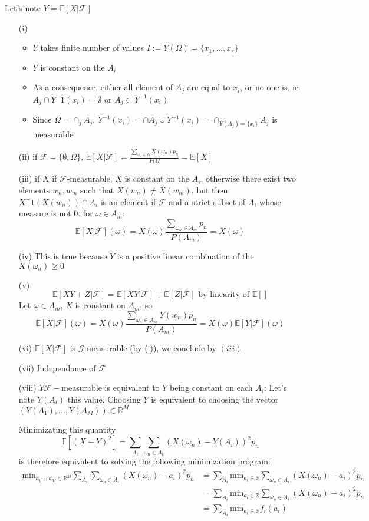 \documentclass[12pt]{article}
\newcommand{\Exp}[1]{\mathbb{E}[#1]}
\newcommand{\Fil}{\mathcal{F}}
\newcommand{\FExp}[1]{\mathbb{E}[#1 | \Fil]}
\newcommand{\Gil}{\mathcal{G}}
\begin{document}
Let's note $Y = \Exp{X | \Fil}$
\begin{itemize}

\item [(i)]
\begin{itemize}
\item $Y$ takes finite number of values $I := Y(\Omega) = \{x_1, ..., x_r\}$
\item $Y$ is constant on the $A_i$
\item As a consequence, either all element of $A_j$ are equal to $x_i$, or no one is. ie $A_j \cap Y^-1(x_i) = \emptyset$ or $A_j \subset Y^{-1}(x_i)$
\item Since $\Omega = \cap_j A_j$, $Y^{-1}(x_i) = \cap A_j \cup Y^{-1}(x_i) = \cap_{Y(A_j) = \{x_i\}}  A_j$ is measurable
\end{itemize}
\item [(ii)] if $\Fil = \{\emptyset, \Omega\}$, $\Exp{X | \Fil} = \frac{\sum_{\omega_n \in \Omega} X(\omega_n) p_n}{P(\Omega} = \Exp{X}$
\item [(iii)] if $X$ if $\Fil$-measurable, $X$ is constant on the $A_i$, otherwise there exist two elements $w_n, w_m$ such that $X(w_n) \neq X(w_m)$, but then $X^-1( X(w_n) ) \cap A_i$ is an element if $\Fil$ and a strict subset of $A_i$ whose measure is not 0.
for $\omega \in A_m$: $$\Exp{X|\Fil}(\omega) = X(\omega ) \frac{\sum_{\omega_n \in A_m}  p_n}{P(A_m)} = X(\omega)$$
\item [(iv)] This is true because $Y$ is a positive linear combination of the $X(\omega_n) \geq 0$
\item [(v)] 
$$\FExp{X Y + Z} = \FExp{X Y} + \FExp{Z}  \text{ by linearity of } \Exp{}$$
Let $\omega \in A_m$, $X$ is constant on $A_m$, so
$$\FExp{X}(\omega) = X(\omega ) \frac{\sum_{\omega_n \in A_m} Y(w_n) p_n}{P(A_m)} = X(\omega) \FExp{Y}(\omega)$$
\item [(vi)]
$\FExp{X}$ is $\Gil$-measurable (by (i)), we conclude by $(iii)$.
\item [(vii)] Independance of $\Fil$
\item [(viii)] $Y \Fil-$measurable is equivalent to $Y$ being constant on each $A_i$: Let's note $Y(A_i)$ this value. Choosing $Y$ is equivalent to choosing the vector $(Y(A_1), ..., Y(A_M)) \in \mathbb{R}^M$

Minimizating this quantity
$$\Exp{(X-Y)^2} = \sum_{A_i} \sum_{\omega_n \in A_i} (X(\omega_n) - Y(A_i))^2 p_n$$
is therefore equivalent to solving the following minimization program:
\begin{align*}
\text{min}_{a_1, ... a_M \in \mathbb{R}^M }  \sum_{A_i} \sum_{\omega_n \in A_i} (X(\omega_n) - a_i)^2 p_n 
&=  \sum_{A_i} \text{min}_{a_i \in \mathbb{R}} \sum_{\omega_n \in A_i} (X(\omega_n) - a_i)^2 p_n
\\ &= \sum_{A_i} \text{min}_{a_i \in \mathbb{R}} \sum_{\omega_n \in A_i} (X(\omega_n) - a_i)^2 p_n
\\ &= \sum_{A_i} \text{min}_{a_i \in \mathbb{R}} f_i(a_i)
\end{align*}


\end{itemize}
\end{document}
